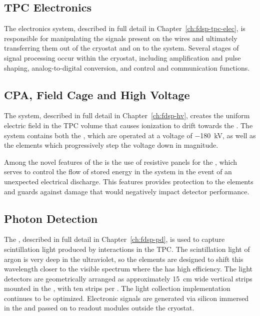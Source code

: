 \subsection{TPC Electronics}
\label{sec:fdsp-ov-elec}

The electronics system, described in full detail in Chapter~\ref{ch:fdsp-tpc-elec}, is responsible for manipulating the signals present on the  wires and ultimately transferring them out of the cryostat and on to the  system.  %
Several stages of signal processing occur within the cryostat, including  amplification and pulse shaping, analog-to-digital conversion, and control and communication functions.



\subsection{CPA, Field Cage and High Voltage}
\label{sec:fdsp-ov-hv}

The  system, described in full detail in Chapter~\ref{ch:fdsp-hv}, creates the uniform electric field in the TPC volume that causes ionization to drift towards the .  The  system contains both the , which are operated at a 
voltage of \SI{-180}{kV}, as well as the  elements which progressively step the  voltage down in magnitude.  

Among the novel features of the \single \lartpc is the use of resistive panels for the , which serves to control the flow of stored energy in the  system in the event of an unexpected electrical discharge.  This features provides protection to the  elements and guards against damage that would negatively impact detector performance.  


\subsection{Photon Detection}
\label{sec:fdsp-ov-pds}

The , described in full detail in Chapter~\ref{ch:fdsp-pd}, is used to capture scintillation light produced by interactions in the TPC.  The scintillation light of argon is very deep in the ultraviolet, so the  elements are designed to shift this wavelength closer to the visible spectrum where the  has high efficiency.   
The  light detectors are geometrically arranged as approximately \SI{15}{cm} wide vertical strips mounted in the , with ten strips per .  The light collection implementation continues to be optimized.  Electronic signals are generated via silicon  immersed in the \lar and passed on to readout modules outside the cryostat.

